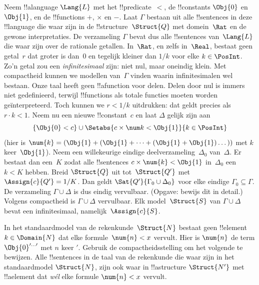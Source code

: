\documentclass[../../../include/open-logic-section]{subfiles}
\begin{document}
{\begin{ex}
Neem !!a{language} $\Lang{L}$ met het !!{predicate}~$<$, de
!!{constant}s $\Obj{0}$ en $\Obj{1}$, en de !!{function}s $+$, $\times$
en $-$. Laat $\Gamma$ bestaan uit alle !!{sentence}s in deze
!!{language} die waar zijn in de !!{structure}~$\Struct{Q}$ met
domein~$\Rat$ en de gewone interpretaties. De verzameling $\Gamma$
bevat dus alle !!{sentence}s van~$\Lang{L}$ die waar zijn over de
rationale getallen. In~$\Rat$, en zelfs in~$\Real$, bestaat geen
getal~$r$ dat groter is dan~$0$ en tegelijk kleiner dan $1/k$ voor elke
$k \in \PosInt$. Zo'n getal zou een \emph{infinitesimaal} zijn: niet nul,
maar oneindig klein. Met compactheid kunnen we modellen van~$\Gamma$
vinden waarin infinitesimalen wel bestaan. Onze taal heeft geen
!!a{function} voor delen. Delen door nul is immers niet gedefinieerd,
terwijl !!{function}s als totale functies moeten worden geïnterpreteerd.
Toch kunnen we $r < 1/k$ uitdrukken: dat geldt precies als
$r \cdot k < 1$. Neem nu een nieuwe !!{constant}~$c$ en laat $\Delta$
gelijk zijn aan
\[
\{\Obj{0} < c\}
\cup \Setabs{ c \times \num k < \Obj{1} }{k \in \PosInt}
\]
(hier is $\num{k} = (\Obj{1} + (\Obj{1} + \dots + (\Obj{1} +
\Obj{1})\dots))$ met $k$ keer~$\Obj{1}$). Neem een willekeurige eindige
deelverzameling~$\Delta_0$ van~$\Delta$. Er bestaat dan een~$K$ zodat
alle !!{sentence}s $c \times \num{k} < \Obj{1}$ in~$\Delta_0$ een
$k < K$ hebben. Breid $\Struct{Q}$ uit tot~$\Struct{Q'}$ met
$\Assign{c}{Q'} = 1/K$. Dan geldt $\Sat{Q'}{\Gamma_0 \cup \Delta_0}$
voor elke eindige $\Gamma_0 \subseteq \Gamma$. De verzameling
$\Gamma \cup \Delta$ is dus eindig vervulbaar. (Opgave: bewijs dit in
detail.) Volgens compactheid is $\Gamma \cup \Delta$ vervulbaar. Elk
model~$\Struct{S}$ van $\Gamma \cup \Delta$ bevat een infinitesimaal,
namelijk~$\Assign{c}{S}$.
\end{ex}
}{}

\begin{prob}
In het standaardmodel van de rekenkunde~$\Struct{N}$ bestaat geen
!!{element}~$k \in \Domain{N}$ dat elke formule~$\num{n} < x$ vervult.
Hier is $\num{n}$ de term $\Obj{0}^{\prime\dots\prime}$ met $n$ keer
$\prime$. Gebruik de compactheidsstelling om het volgende te bewijzen.
Alle !!{sentence}s in de taal van de rekenkunde die waar zijn in het
standaardmodel $\Struct{N}$, zijn ook waar in !!a{structure}
$\Struct{N'}$ met !!a{element} dat \emph{wél} elke formule $\num{n} < x$
vervult.
\end{prob}
\tagendprob
\end{document}
